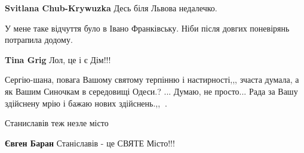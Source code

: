 \begin{itemize}
\begin{itemize}
\textbf{Svitlana Chub-Krywuzka} Десь біля Львова недалечко.

\end{itemize}

 
У мене таке відчуття було в Івано Франківську. Ніби після довгих поневірянь потрапила додому.

\begin{itemize}
 
\textbf{Tina Grig} Лол, це і є Дім!!!
\end{itemize}

 
Сергію-шана, повага Вашому святому терпінню і настирності,,, зчаста думала, а як Вашим Синочкам в середовищі Одеси.? ... Думаю, не просто... Рада за Вашу здійснену мрію і бажаю нових здійснень.,,🤗🔱.

 
Станиславів теж незле місто

\begin{itemize}
 
\textbf{Євген Баран} Станіславів - це СВЯТЕ Місто!!!
\end{itemize}

 

\end{itemize}
